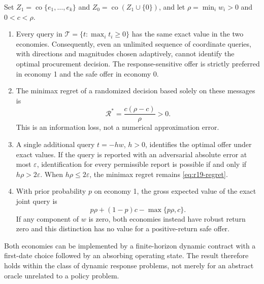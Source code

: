 \begin{theorem}
\label{thm:r19-information}
Set $Z_1=\operatorname{co}\{e_1,\ldots,e_k\}$ and $Z_0=\operatorname{co}(Z_1\cup\{0\})$, and let $\rho=\min_i w_i>0$ and $0<c<\rho$.
\begin{enumerate}
\item Every query in $\mathcal T=\{t:\max_i t_i\geq0\}$ has the same exact value in the two economies. Consequently, even an unlimited sequence of coordinate queries, with directions and magnitudes chosen adaptively, cannot identify the optimal procurement decision. The response-sensitive offer is strictly preferred in economy 1 and the safe offer in economy 0.
\item The minimax regret of a randomized decision based solely on these messages is
\begin{equation}
 \mathcal R^*=\frac{c(\rho-c)}{\rho}>0.
 \label{eq:r19-regret}
\end{equation}
This is an information loss, not a numerical approximation error.
\item A single additional query $t=-hw$, $h>0$, identifies the optimal offer under exact values. If the query is reported with an adversarial absolute error at most $\varepsilon$, identification for every permissible report is possible if and only if $h\rho>2\varepsilon$. When $h\rho\leq2\varepsilon$, the minimax regret remains \eqref{eq:r19-regret}.
\item With prior probability $p$ on economy 1, the gross expected value of the exact joint query is
\begin{equation}
 p\rho+(1-p)c-\max\{p\rho,c\}.
 \label{eq:r19-information-value}
\end{equation}
If any component of $w$ is zero, both economies instead have robust return zero and this distinction has no value for a positive-return safe offer.
\end{enumerate}
Both economies can be implemented by a finite-horizon dynamic contract with a first-date choice followed by an absorbing operating state. The result therefore holds within the class of dynamic response problems, not merely for an abstract oracle unrelated to a policy problem.
\end{theorem}

